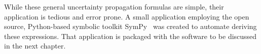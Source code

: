 While these general uncertainty propagation formulas are simple, their
application is tedious and error prone.  A small application employing the open
source, Python-based symbolic toolkit SymPy~\citep{SymPy} was created to
automate deriving these expressions.  That application is packaged with the
software to be discussed in the next chapter.
